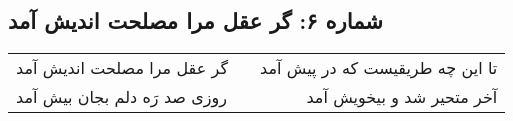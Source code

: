 \begin{center}
\section*{شماره ۶: گر عقل مرا مصلحت اندیش آمد}
\label{sec:006}
\begin{longtable}{l p{0.5cm} r}
گر عقل مرا مصلحت اندیش آمد
&&
تا این چه طریقیست که در پیش آمد
\\
روزی صد رَه دلم بجان بیش آمد
&&
آخر متحیر شد و بیخویش آمد
\\
\end{longtable}
\end{center}
